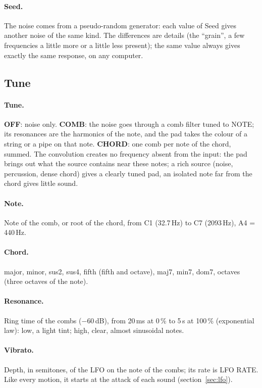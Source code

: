 \documentclass[a4paper,11pt]{article}
\newcommand{\ctl}[1]{\textsf{\textbf{#1}}}   %
\newcommand{\dB}{\,dB}
\begin{document}
\paragraph{Seed.} The noise comes from a pseudo-random generator: each value of Seed gives another
noise of the same kind. The differences are details (the ``grain'', a few frequencies a little more
or a little less present); the same value always gives exactly the same response, on any computer.

\subsection{Tune}

\paragraph{Tune.} \ctl{OFF}: noise only. \ctl{COMB}: the noise goes through a comb filter tuned to
NOTE; its resonances are the harmonics of the note, and the pad takes the colour of a string or a
pipe on that note. \ctl{CHORD}: one comb per note of the chord, summed. The convolution creates no
frequency absent from the input: the pad brings out what the source contains near these notes; a
rich source (noise, percussion, dense chord) gives a clearly tuned pad, an isolated note far from
the chord gives little sound.

\paragraph{Note.} Note of the comb, or root of the chord, from C1 (32.7\,Hz) to C7 (2093\,Hz),
A4 = 440\,Hz.

\paragraph{Chord.} major, minor, sus2, sus4, fifth (fifth and octave), maj7, min7, dom7, octaves
(three octaves of the note).

\paragraph{Resonance.} Ring time of the combs ($-60$\dB), from 20\,ms at 0\,\% to 5\,s at 100\,\%
(exponential law): low, a light tint; high, clear, almost sinusoidal notes.

\paragraph{Vibrato.} Depth, in semitones, of the LFO on the note of the combs; its rate is LFO
RATE. Like every motion, it starts at the attack of each sound (section~\ref{sec:lfo}).
\end{document}
